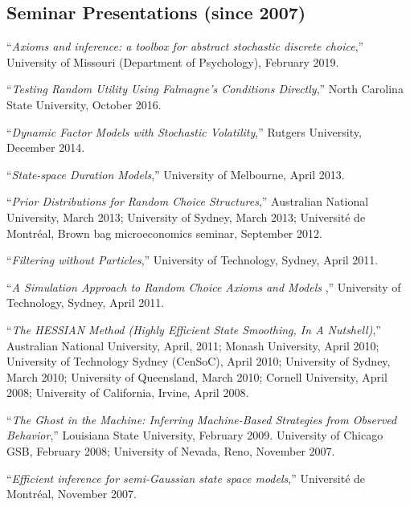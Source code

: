 \documentclass[12pt]{article}
\begin{document}
\subsection*{Seminar Presentations (since 2007)}

``{\it Axioms and inference: a toolbox for abstract stochastic discrete choice},''
University of Missouri (Department of Psychology), February 2019.

``{\it Testing Random Utility Using Falmagne's Conditions Directly},''
North Carolina State University, October 2016.

``{\it Dynamic Factor Models with Stochastic Volatility},''
Rutgers University, December 2014.

``{\it State-space Duration Models},''
University of Melbourne, April 2013.

``{\it Prior Distributions for Random Choice Structures},''
Australian National University, March 2013;
University of Sydney, March 2013;
Universit\'e de Montr\'eal, Brown bag microeconomics seminar, September 2012.

``{\it Filtering without Particles},''
University of Technology, Sydney, April 2011.

``{\it A Simulation Approach to Random Choice Axioms and Models },''
University of Technology, Sydney, April 2011.

``{\it The HESSIAN Method (Highly Efficient State Smoothing, In A Nutshell)},''
Australian National University, April, 2011;
Monash University, April 2010;
University of Technology Sydney (CenSoC), April 2010;
University of Sydney, March 2010;
University of Queensland, March 2010;
Cornell University, April 2008;
University of California, Irvine, April 2008.

``{\it The Ghost in the Machine: Inferring Machine-Based Strategies from Observed Behavior},'' 
Louisiana State University, February 2009.
University of Chicago GSB, February 2008;
University of Nevada, Reno, November 2007.

``{\it Efficient inference for semi-Gaussian state space models},''
Universit\'e de Montr\'eal, November 2007.


\end{document}
